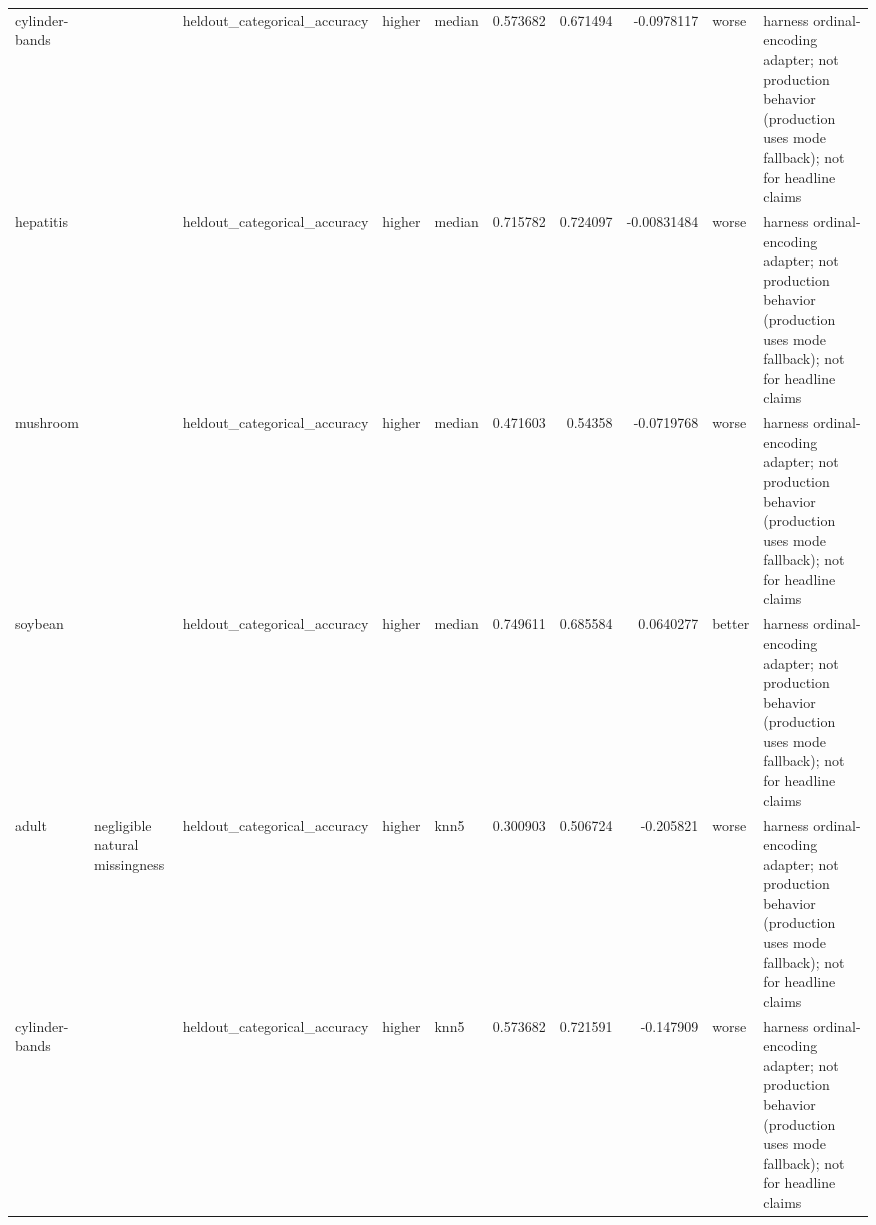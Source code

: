 \begin{table}[ht]
{\begin{tabular}{lllllrrrll}
 cylinder-bands &                                                                       & heldout\_categorical\_accuracy   & higher             & median           &                   0.573682 &               0.671494 &                    -0.0978117   & worse                & harness ordinal-encoding adapter; not production behavior (production uses mode fallback); not for headline claims \\
 hepatitis      &                                                                       & heldout\_categorical\_accuracy   & higher             & median           &                   0.715782 &               0.724097 &                    -0.00831484  & worse                & harness ordinal-encoding adapter; not production behavior (production uses mode fallback); not for headline claims \\
 mushroom       &                                                                       & heldout\_categorical\_accuracy   & higher             & median           &                   0.471603 &               0.54358  &                    -0.0719768   & worse                & harness ordinal-encoding adapter; not production behavior (production uses mode fallback); not for headline claims \\
 soybean        &                                                                       & heldout\_categorical\_accuracy   & higher             & median           &                   0.749611 &               0.685584 &                     0.0640277   & better               & harness ordinal-encoding adapter; not production behavior (production uses mode fallback); not for headline claims \\
 adult          & negligible natural missingness                                        & heldout\_categorical\_accuracy   & higher             & knn5             &                   0.300903 &               0.506724 &                    -0.205821    & worse                & harness ordinal-encoding adapter; not production behavior (production uses mode fallback); not for headline claims \\
 cylinder-bands &                                                                       & heldout\_categorical\_accuracy   & higher             & knn5             &                   0.573682 &               0.721591 &                    -0.147909    & worse                & harness ordinal-encoding adapter; not production behavior (production uses mode fallback); not for headline claims \\

\end{tabular}}
\end{table}
